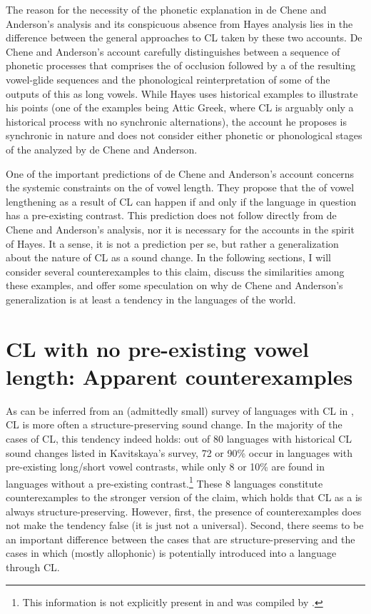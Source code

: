 \documentclass[output=paper,
modfonts
]{LSP/langsci}
\begin{document}
The reason for the necessity of the phonetic explanation in de Chene and
Anderson's analysis and its conspicuous absence from Hayes analysis lies
in the difference between the general approaches to CL taken by these
two accounts. De Chene and Anderson's account carefully distinguishes
between a sequence of phonetic processes that comprises the 
of occlusion followed by a  of the resulting
vowel-glide sequences and the phonological reinterpretation of some of
the outputs of this  as long vowels. While Hayes uses
historical examples to illustrate his points (one of the examples being
Attic Greek, where CL is arguably only a historical process with no
synchronic alternations), the account he proposes is synchronic in
nature and does not consider either phonetic or phonological stages of
the  analyzed by de Chene and Anderson.

One of the important predictions of de Chene and Anderson's account
concerns the systemic constraints on the  of vowel
length. They propose that the  of vowel lengthening as a
result of CL can happen if and only if the language in question has
a pre-existing  contrast. This prediction does not follow
directly from de Chene and Anderson's analysis, nor it is necessary for
the accounts in the spirit of Hayes. It a sense, it is not a prediction
per se, but rather a generalization about the nature of CL as a sound
change. In the following sections, I will consider several
counterexamples to this claim, discuss the similarities among these
examples, and offer some speculation on why de Chene and Anderson's
generalization is at least a tendency in the languages of the world.

\section{CL with no pre-existing vowel length: Apparent counterexamples}

As can be inferred from an (admittedly small) survey of languages with
CL in \citet{kavitskaya2002}, CL is more often a structure-preserving sound
change. In the majority of the cases of CL, this tendency indeed holds:
out of 80 languages with historical CL sound changes listed in
Kavitskaya's \citeyearpar{kavitskaya2002} survey, 72 or 90\% occur in languages with
pre-existing long/short vowel contrasts, while only 8 or 10\% are found
in languages without a pre-existing  contrast.\footnote{This
  information is not explicitly present in \citet{kavitskaya2002} and was
  compiled by \citet{blevins2009k}.} These 8 languages constitute
counterexamples to the stronger version of the claim, which holds that
CL as a  is always structure-preserving. However, first, the
presence of counterexamples does not make the tendency false (it is just
not a universal). Second, there seems to be an important difference
between the cases that are structure-preserving and the cases in which
 (mostly allophonic) is potentially introduced into a
language through CL.
\end{document}
